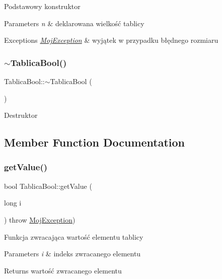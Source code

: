 Podstawowy konstruktor 
\begin{DoxyParams}{Parameters}
{\em n} & deklarowana wielkość tablicy \\
\hline
\end{DoxyParams}

\begin{DoxyExceptions}{Exceptions}
{\em \mbox{\hyperlink{class_moj_exception}{Moj\+Exception}}} & wyjątek w przypadku błędnego rozmiaru \\
\hline
\end{DoxyExceptions}
\mbox{\label{class_tablica_bool_a9b19caafe772bab056c6405d76e7d155}} 
\subsubsection{\texorpdfstring{$\sim$\+Tablica\+Bool()}{~TablicaBool()}}
{\footnotesize\ttfamily Tablica\+Bool\+::$\sim$\+Tablica\+Bool (\begin{DoxyParamCaption}{ }\end{DoxyParamCaption})}

Destruktor 

\subsection{Member Function Documentation}
\mbox{\label{class_tablica_bool_af84af9cb90889428f629736eb7a01ca2}} 
\subsubsection{\texorpdfstring{get\+Value()}{getValue()}}
{\footnotesize\ttfamily bool Tablica\+Bool\+::get\+Value (\begin{DoxyParamCaption}\item[{long}]{i }\end{DoxyParamCaption}) throw  \mbox{\hyperlink{class_moj_exception}{Moj\+Exception}}) }

Funkcja zwracająca wartość elementu tablicy 
\begin{DoxyParams}{Parameters}
{\em i} & indeks zwracanego elementu \\
\hline
\end{DoxyParams}
\begin{DoxyReturn}{Returns}
wartość zwracanego elementu 
\end{DoxyReturn}

